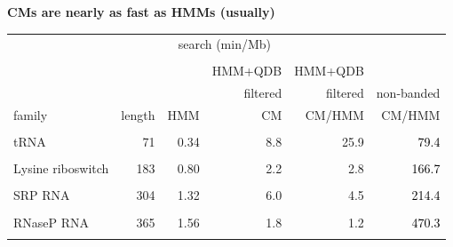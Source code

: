 \documentclass[landscape]{slides}
\begin{document}
\begin{slide}
\begin{center}

  \textbf{CMs are nearly as fast as HMMs (usually)}
\end{center}


\small
\begin{center}
\small
\begin{tabular}{lr|rr|r|r}
                  &        & \multicolumn{2}{c|}{search (min/Mb)} & \multicolumn{2}{c}{}\\ \cline{3-4}
                  &        &        &        &            &         \\

                  &        &        & \textcolor{mypurple}{HMM+QDB}    & \textcolor{mypurple}{HMM+QDB}  & \\
                  &        &        & \textcolor{mypurple}{filtered}   & \textcolor{mypurple}{filtered}& non-banded        \\
family            & length & HMM    & \textcolor{mypurple}{CM}     & \textcolor{mypurple}{CM/HMM} & CM/HMM  \\ \hline
                  &        &        &        &            &         \\
tRNA              & 71     &  0.34  &  \textcolor{mypurple}{8.8}   & \textcolor{mypurple}{25.9} & \textcolor{black}{79.4}\\
                  &        &        &        &            &         \\
Lysine riboswitch & 183    &  0.80  &  \textcolor{mypurple}{2.2}   & \textcolor{mypurple}{2.8}  & \textcolor{black}{166.7}\\
                  &        &        &        &            &         \\
SRP RNA           & 304    &  1.32  &  \textcolor{mypurple}{6.0}   & \textcolor{mypurple}{4.5} & \textcolor{black}{214.4}\\
                  &        &        &        &            &         \\
RNaseP RNA        & 365    &  1.56  &  \textcolor{mypurple}{1.8}   & \textcolor{mypurple}{1.2} & \textcolor{black}{470.3}\\
                  &        &        &        &            &         \\

\end{tabular}
\end{center}

\vfill

\end{slide}
\end{document}
